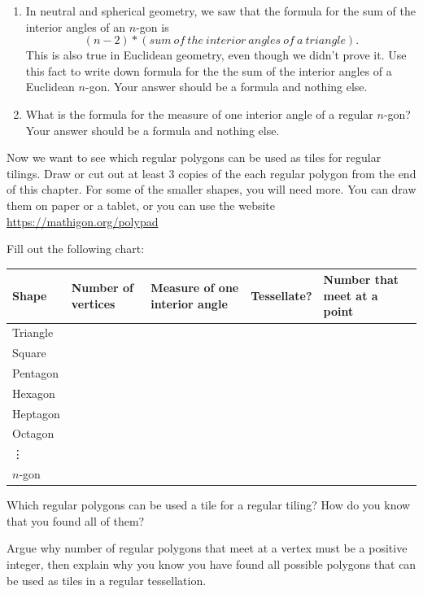 \documentclass[newpage,hints,handout]{ximera}
\begin{document}
\begin{problem}
\begin{enumerate}
\item In neutral and spherical geometry, we saw that the formula for the sum of the interior angles of an $n$-gon is \[(n-2)*(sum\ of \ the\ interior\ angles\ of\ a\ triangle).\]  This is also true in Euclidean geometry, even though we didn't prove it. Use this fact to write down formula for the the sum of the interior angles of a Euclidean $n$-gon. Your answer should be a formula and nothing else.
\item What is the formula for the measure of one interior angle of a regular $n$-gon? Your answer should be a formula and nothing else.
\end{enumerate}
\end{problem}
\begin{problem}
Now we want to see which regular polygons can be used as tiles for regular tilings. Draw or cut out at least 3 copies of the each regular polygon from the end of this chapter. For some of the smaller shapes, you will need more. You can draw them on paper or a tablet, or you can use the website \url{https://mathigon.org/polypad}

Fill out the following chart:

\begin{tabular}{|p{3cm}|p{1.2cm}|p{2cm}|p{1.5cm}|p{2cm}|}\hline
 Shape & Number of {vertices} & Measure of one interior angle  & Tessellate? & Number that meet at a point\\\hline
 Triangle &&&&\\\hline
 Square&&&&\\\hline
 Pentagon&&&&\\\hline
 Hexagon&&&&\\\hline
 Heptagon&&&&\\\hline
Octagon&&&&\\\hline
 \vdots\\\hline
 $n$-gon&&&&\\\hline
\end{tabular}
\end{problem}
\begin{problem}
 Which regular polygons can be used a tile for a regular tiling? How do you know that you found all of them?
 
\begin{hint}
Argue why number of regular polygons that meet at a vertex must be a positive integer, then explain why you know you have found all possible polygons that can be used as tiles in a regular tessellation. 
\end{hint}
\end{problem}
\end{document}
